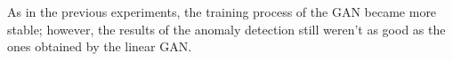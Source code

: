As in the previous experiments, the training process of the GAN became more stable; however, the results of the anomaly detection still weren't as good as the ones obtained by the linear GAN.









